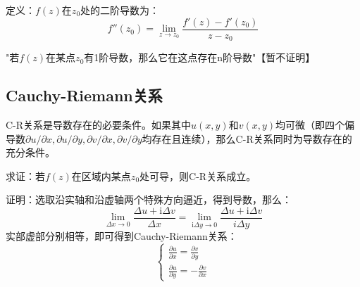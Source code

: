 定义：$f(z)$在$z_0$处的二阶导数为：
\begin{equation}
f''(z_0) = \lim\limits_{z\rightarrow z_0}\frac{f'(z)-f'(z_0)}{z-z_0}
\end{equation}

"若$f(z)$在某点$z_0$有1阶导数，那么它在这点存在n阶导数"【暂不证明】

\subsection{Cauchy-Riemann关系}

C-R关系是导数存在的必要条件。如果其中$u(x,y)$和$v(x,y)$均可微（即四个偏导数$\partial u/\partial x,\partial u/\partial y,\partial v/\partial x,\partial v/\partial y$均存在且连续），那么C-R关系同时为导数存在的充分条件。

求证：若$f(z)$在区域内某点$z_0$处可导，则C-R关系成立。

证明：选取沿实轴和沿虚轴两个特殊方向逼近，得到导数，那么：
	\[\lim\limits_{\Delta x\rightarrow 0}\frac{\Delta u+\mathrm{i}\Delta v}{\Delta x} = \lim\limits_{\mathrm{i}\Delta y\rightarrow 0}\frac{\Delta u+\mathrm{i}\Delta v}{i\Delta y}\]
	实部虚部分别相等，即可得到Cauchy-Riemann关系：
	\begin{equation}
	\left\{\begin{array}{l}
	\frac{\partial u}{\partial x} = \frac{\partial v}{\partial y}\\
	\frac{\partial u}{\partial y} = -\frac{\partial v}{\partial x}
	\end{array}
	\right.
	\end{equation}



